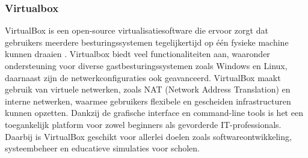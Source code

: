 \subsubsection{Virtualbox}
VirtualBox is een open-source virtualisatiesoftware die ervoor zorgt dat gebruikers meerdere besturingssystemen tegelijkertijd op één fysieke machine kunnen draaien \autocite{Oracle}. Virtualbox biedt veel functionaliteiten aan, waaronder ondersteuning voor diverse gastbesturingssystemen zoals Windows en Linux, daarnaast zijn de netwerkconfiguraties ook geavanceerd. VirtualBox maakt gebruik van virtuele netwerken, zoals NAT (Network Address Translation) en interne netwerken, waarmee gebruikers flexibele en gescheiden infrastructuren kunnen opzetten. Dankzij de grafische interface en command-line tools is het een toegankelijk platform voor zowel beginners als gevorderde IT-professionals. Daarbij is VirtualBox geschikt voor allerlei doelen zoals softwareontwikkeling, systeembeheer en educatieve simulaties voor scholen.